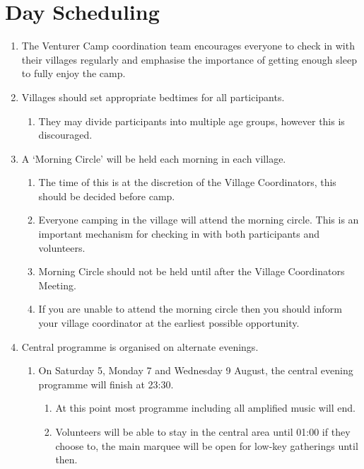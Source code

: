 \documentclass[a4paper, 11pt]{report}
\def\enumMarginIndentOne{4em}
\def\enumMarginIndentTwo{5em}
\begin{document}
    \chapter{Day Scheduling}
    \begin{enumerate}
        \item The Venturer Camp coordination team encourages everyone to check in with their villages regularly and emphasise the importance of getting enough sleep to fully enjoy the camp.
        \item Villages should set appropriate bedtimes for all participants.
        \begin{enumerate}[leftmargin=\enumMarginIndentOne]
            \item They may divide participants into multiple age groups, however this is discouraged.
        \end{enumerate}
        \item A `Morning Circle' will be held each morning in each village.
        \begin{enumerate}[leftmargin=\enumMarginIndentOne]
            \item The time of this is at the discretion of the Village Coordinators, this should be decided before camp.
            \item Everyone camping in the village will attend the morning circle. This is an important mechanism for checking in with both participants and volunteers.
            \item Morning Circle should not be held until after the Village Coordinators Meeting.
            \item If you are unable to attend the morning circle then you should inform your village coordinator at the earliest possible opportunity. 
        \end{enumerate}
        \item Central programme is organised on alternate evenings.
        \begin{enumerate}[leftmargin=\enumMarginIndentOne]
            \item On Saturday 5, Monday 7 and Wednesday 9 August, the central evening programme will finish at 23:30.
            \begin{enumerate}[leftmargin=\enumMarginIndentTwo]
                \item At this point most programme including all amplified music will end.
                \item Volunteers will be able to stay in the central area until 01:00 if they choose to, the main marquee will be open for low-key gatherings until then.

\end{enumerate}
\end{enumerate}
\end{enumerate}
\end{document}

